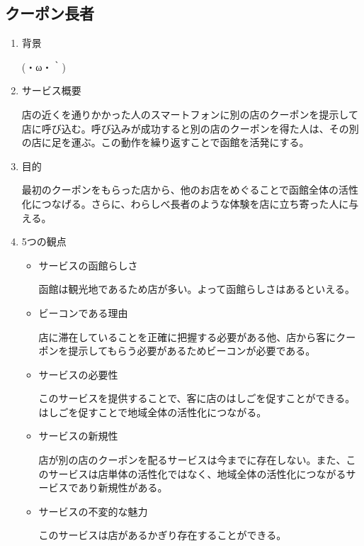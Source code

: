 \subsection{クーポン長者}
\begin{enumerate}
    \item 背景
    \par (・ω・｀)
    \item サービス概要
    \par 店の近くを通りかかった人のスマートフォンに別の店のクーポンを提示して店に呼び込む。呼び込みが成功すると別の店のクーポンを得た人は、その別の店に足を運ぶ。この動作を繰り返すことで函館を活発にする。
    \item 目的
    \par 最初のクーポンをもらった店から、他のお店をめぐることで函館全体の活性化につなげる。さらに、わらしべ長者のような体験を店に立ち寄った人に与える。
    \item 5つの観点
    \begin{itemize}
        \item サービスの函館らしさ
        \par 函館は観光地であるため店が多い。よって函館らしさはあるといえる。
        \item ビーコンである理由
        \par 店に滞在していることを正確に把握する必要がある他、店から客にクーポンを提示してもらう必要があるためビーコンが必要である。
        \item サービスの必要性
        \par このサービスを提供することで、客に店のはしごを促すことができる。はしごを促すことで地域全体の活性化につながる。
        \item サービスの新規性
        \par 店が別の店のクーポンを配るサービスは今までに存在しない。また、このサービスは店単体の活性化ではなく、地域全体の活性化につながるサービスであり新規性がある。
        \item サービスの不変的な魅力
        \par このサービスは店があるかぎり存在することができる。
    \end{itemize}
\end{enumerate}

